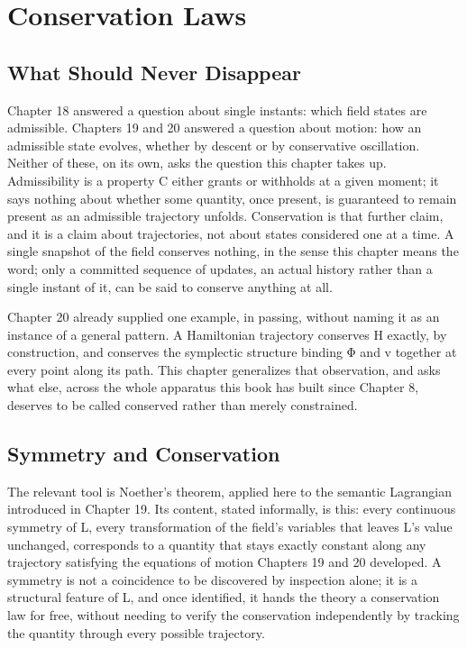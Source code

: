 \chapter{Conservation Laws}

\section{What Should Never Disappear}

Chapter 18 answered a question about single instants: which field states are admissible. Chapters 19 and 20 answered a question about motion: how an admissible state evolves, whether by descent or by conservative oscillation. Neither of these, on its own, asks the question this chapter takes up. Admissibility is a property C either grants or withholds at a given moment; it says nothing about whether some quantity, once present, is guaranteed to remain present as an admissible trajectory unfolds. Conservation is that further claim, and it is a claim about trajectories, not about states considered one at a time. A single snapshot of the field conserves nothing, in the sense this chapter means the word; only a committed sequence of updates, an actual history rather than a single instant of it, can be said to conserve anything at all.

Chapter 20 already supplied one example, in passing, without naming it as an instance of a general pattern. A Hamiltonian trajectory conserves H exactly, by construction, and conserves the symplectic structure binding Φ and v together at every point along its path. This chapter generalizes that observation, and asks what else, across the whole apparatus this book has built since Chapter 8, deserves to be called conserved rather than merely constrained.

\section{Symmetry and Conservation}

The relevant tool is Noether's theorem, applied here to the semantic Lagrangian introduced in Chapter 19. Its content, stated informally, is this: every continuous symmetry of L, every transformation of the field's variables that leaves L's value unchanged, corresponds to a quantity that stays exactly constant along any trajectory satisfying the equations of motion Chapters 19 and 20 developed. A symmetry is not a coincidence to be discovered by inspection alone; it is a structural feature of L, and once identified, it hands the theory a conservation law for free, without needing to verify the conservation independently by tracking the quantity through every possible trajectory.

